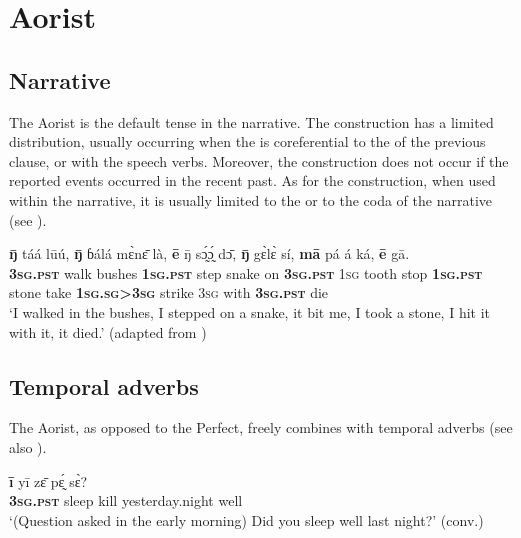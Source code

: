 \documentclass[output=paper,newtxmath,modfonts,nonflat,hidelinks]{langsci/langscibook}
\begin{document}
\section{Aorist}
\label{khachsaorist}
\subsection{Narrative}
\label{khachnarr}

The Aorist is the default tense in the narrative. The  construction has a limited distribution, usually occurring when the  is coreferential to the  of the previous clause, or with the speech verbs. Moreover, the  construction does not occur if the reported events occurred in the recent past. As for the  construction, when used within the narrative, it is usually limited to the  or to the coda of the narrative (see ).  

\begin{exe}
\ex
\gll \textbf{ŋ̄} táá lūú, \textbf{ŋ̄} ɓálá mɛ̀nɛ̄ là, \textbf{ē} ŋ̄ sɔ̰́ɔ̰́ dɔ̄, \textbf{ŋ̄} gɛ̀lɛ̀ sí, \textbf{mā} pá á ká, \textbf{ē} gā. \\
\textbf{3\textsc{sg}.\textsc{pst}} walk bushes \textbf{1\textsc{sg}.\textsc{pst}} step snake on \textbf{3\textsc{sg}.\textsc{pst}} 1\textsc{sg} tooth stop \textbf{1\textsc{sg}.\textsc{pst}} stone take \textbf{1\textsc{sg}.\textsc{sg}>3\textsc{sg}} strike 3\textsc{sg} with \textbf{3\textsc{sg}.\textsc{pst}} die\\
\glt ‘I walked in the bushes, I stepped on a snake, it bit me, I took a stone, I hit it with it, it died.' (adapted from \citealt[801, ex. 8]{khachdahl2000})
\end{exe}

\subsection{Temporal adverbs}
\label{khachsectempadv}

The Aorist, as opposed to the Perfect, freely combines with temporal adverbs (see also ).

\begin{exe} \ex
\gll	\textbf{ī}	yī	zɛ̄	pɛ̰́	sɛ̀?	 \\	
	\textbf{3\textsc{sg}.\textsc{pst}}	sleep	kill	yesterday.night	well\\	
\glt ‘(Question asked in the early morning) Did you sleep well last night?’ (conv.)
\end{exe}
\end{document}
